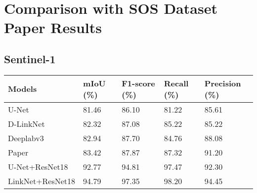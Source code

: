 \documentclass{article}
\begin{document}
\section{Comparison with SOS Dataset Paper Results}

\subsection{Sentinel-1}
\begin{tabular}{lllll}
\toprule
  Models & mIoU (\%) & F1-score (\%) & Recall (\%) & Precision (\%) \\
\midrule
  U-Net     & 81.46 & 86.10 & 81.22 & 85.61 \\
  D-LinkNet & 82.32 & 87.08 & 85.22 & 85.22 \\
  Deeplabv3 & 82.94 & 87.70 & 84.76 & 88.08 \\
  Paper     & 83.42 & 87.87 & 87.32 & 91.20 \\
\midrule 
  U-Net+ResNet18 & 92.77 & 94.81 & 97.47 & 92.30 \\
  LinkNet+ResNet18 & 94.79 & 97.35 & 98.20 & 94.45 \\
\bottomrule
\end{tabular}
\end{document}

